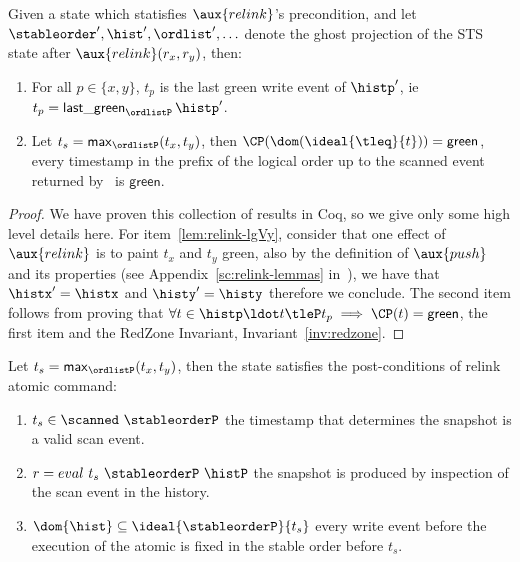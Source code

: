 \begin{theorem}\label{lem:relink-prefix}
 Given a state which statisfies $\aux{relink}$'s precondition, and let
 $\stableorder', \hist', \ordlist', \ldots$ denote the ghost
 projection of the STS state after $\aux{relink}(r_x,r_y)$, then:
 \begin{enumerate}
 \item\label{lem:relink-lgVy} For all $p \in \{x, y\}$, $t_p$ is the
   last green write event of $\histp'$, ie\ $ t_p =
   \mathsf{last\_green}_{\ordlistP}\, \histp'$.
 \item\label{lem:relink-green} Let $t_s = \mathsf{max}_{\ordlistP}
   (t_x,t_y)$, then $\CP(\dom(\ideal{{\tleq}}{t})) = \mathsf{green}$,
   \ie every timestamp in the prefix of the logical order up to the
   scanned event returned by \jyscan\ is $\mathsf{green}$.
 \end{enumerate}
\end{theorem}

\begin{proof}
We have proven this collection of results in Coq, so we give only some
high level details here. For item~\ref{lem:relink-lgVy}, consider that
one effect of $\aux{relink}$ is to paint $t_x$ and $t_y$ green, also
by the definition of $\aux{push}$ and its properties (see
Appendix~\ref{sc:relink-lemmas} in~\cite{CoqFiles}), we have that
$\histx' = \histx$ and $\histy' = \histy$ therefore we conclude. The
second item follows from proving that $\forall t \in \histp\ldot t
\tleP t_p \implies \CP(t)= \mathsf{green}$, the first item and the
RedZone Invariant, Invariant~\ref{inv:redzone}.
\end{proof}

\begin{corollary}\label{lem:relink-scanned} 
  Let $t_s = \mathsf{max}_{\ordlistP} (t_x,t_y)$, then the state
  satisfies the post-conditions of relink atomic command:
  \begin{enumerate}
  \item \label{lem:relink-scanned} $t_s \in \scanned\ \stableorderP$
    the timestamp that determines the snapshot is a valid scan event.
  \item \label{lem:relink-eval} $r = eval\ t_s\ \stableorderP\ \histP $
    the snapshot is produced by inspection of the scan event in the
    history.
  \item \label{lem:relink-hist} $\dom{\hist} \subseteq
    \ideal{\stableorderP}{t_s}$ every write event before the execution
    of the atomic is fixed in the stable order before $t_s$.
  \end{enumerate}
\end{corollary}


